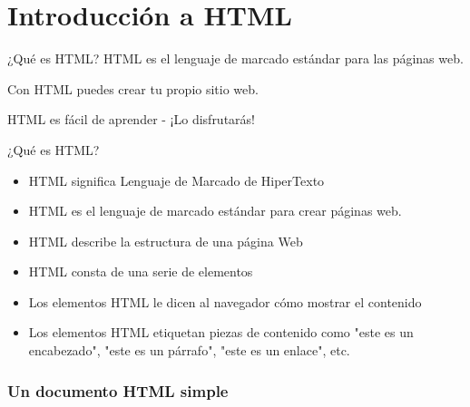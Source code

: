 
\section{Introducción a HTML}

\begin{frame}[c]{¿Qué es HTML?}
  \vspace{\baselineskip}
  HTML es el lenguaje de marcado estándar para las páginas web.

  \vspace{\baselineskip}
  Con HTML puedes crear tu propio sitio web.

  \vspace{\baselineskip}
  HTML es fácil de aprender - ¡Lo disfrutarás!
\end{frame}

\begin{frame}[c]{¿Qué es HTML?}
  \begin{itemize}
    \item HTML significa Lenguaje de Marcado de HiperTexto
    \pausa
    \item HTML es el lenguaje de marcado estándar para crear páginas web.
    \pausa
    \item HTML describe la estructura de una página Web
    \pausa
    \item HTML consta de una serie de elementos
    \pausa
    \item Los elementos HTML le dicen al navegador cómo mostrar el contenido
    \pausa
    \item Los elementos HTML etiquetan piezas de contenido como
      "este es un encabezado", "este es un párrafo", "este es un enlace", etc.
  \end{itemize}
\end{frame}

\begin{frame}[fragile]
  \frametitle{Un documento HTML simple}
  
\end{frame}

